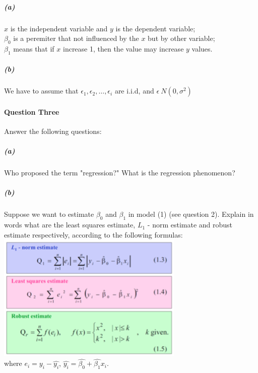 \documentclass[11pt]{article}
\begin{document}
  \paragraph{\color{red}{Answer:}}
    \subparagraph{(a)}
      $x$ is the independent variable and $y$ is the dependent variable; \\
      $\beta_0$ is a peremiter that not influenced by the $x$ but by other variable; \\
      $\beta_1$ means that if $x$ increase 1, then the value may increase $y$ values.
    \subparagraph{(b)}
      We have to assume that $\epsilon_1, \epsilon_2,\dots,\epsilon_i$ are i.i.d, and
      $\epsilon~N(0,\sigma^2)$
  \\

  \paragraph{Question Three}
    Answer the following questions:
  \subparagraph{(a)}
    Who proposed the term "regression?" What is the regression phenomenon?
  \subparagraph{(b)}
    Suppose we want to estimate $\beta_0$ and $\beta_1$ in model (1) (see question 2).
    Explain in words what are the least squares estimate,
    $L_1$ - norm estimate and robust estimate respectively, according to the following formulas:\\
    \includegraphics[width = .8\textwidth]{Q3.png} \\
    where $e_i = y_i - \hat{y_i}$, $\hat{y_i} = \hat{\beta_0} + \hat{\beta_1}x_i$.
\end{document}
